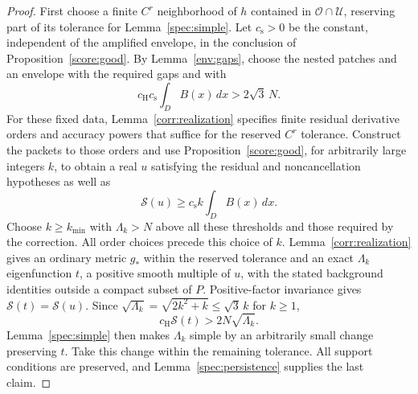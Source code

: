 \begin{proof}
First choose a finite $C^r$ neighborhood of $h$ contained in
$\mathcal O\cap\mathcal U$, reserving part of its tolerance for
Lemma~\ref{spec:simple}.  Let $c_{\mathrm s}>0$ be the constant,
independent of the amplified envelope, in the conclusion of
Proposition~\ref{score:good}.  By Lemma~\ref{env:gaps}, choose the nested
patches and an envelope with the required gaps and with
\[
 c_{\mathrm H}c_{\mathrm s}\int_D B(x)\,dx>2\sqrt3\,N.
\]
For these fixed data, Lemma~\ref{corr:realization} specifies finite residual derivative orders and
accuracy powers that suffice for the reserved $C^r$ tolerance.
Construct the packets to those orders and use
Proposition~\ref{score:good}, for arbitrarily large integers $k$, to obtain
a real $u$ satisfying the residual and noncancellation hypotheses as well
as
\[
 \mathcal S(u)\ge c_{\mathrm s}k\int_D B(x)\,dx.
\]
Choose $k\ge k_{\min}$ with $\Lambda_k>N$ above all these thresholds and those
required by the correction.  All order choices precede this choice of $k$.
Lemma~\ref{corr:realization} gives an ordinary metric $g_*$ within the reserved
tolerance and an exact $\Lambda_k$ eigenfunction $t$, a positive smooth
multiple of $u$, with the stated background identities outside a compact
subset of $P$.  Positive-factor invariance gives
$\mathcal S(t)=\mathcal S(u)$.  Since
$\sqrt{\Lambda_k}=\sqrt{2k^2+k}\le\sqrt3\,k$ for $k\ge1$,
\[
 c_{\mathrm H}\mathcal S(t)>2N\sqrt{\Lambda_k}.
\]
Lemma~\ref{spec:simple} then makes
$\Lambda_k$ simple by an arbitrarily small change preserving $t$.
Take this change within the remaining tolerance.  All support conditions
are preserved, and Lemma~\ref{spec:persistence} supplies the last claim.
\end{proof}

